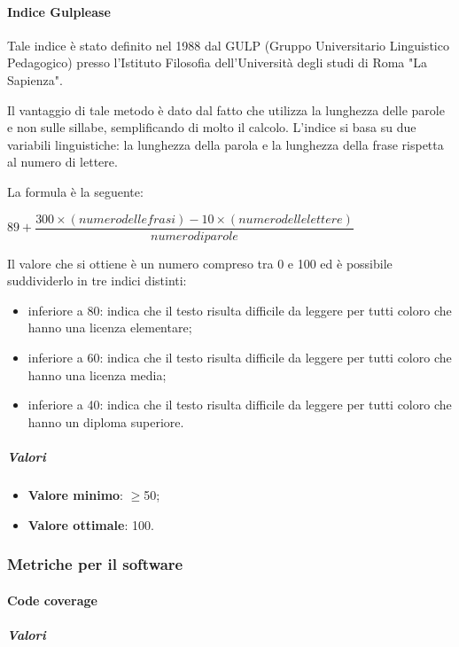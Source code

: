 \paragraph*{Indice Gulplease}
Tale indice è stato definito nel 1988 dal GULP (Gruppo Universitario Linguistico Pedagogico) presso l'Istituto Filosofia dell'Università degli studi di Roma "La Sapienza".

Il vantaggio di tale metodo è dato dal fatto che utilizza la lunghezza delle parole e non sulle sillabe, semplificando di molto il calcolo. L'indice si basa su due variabili linguistiche: la lunghezza della parola e la lunghezza della frase rispetta al numero di lettere.

La formula è la seguente:
\begin{center}
$89+\dfrac{300\times(numerodellefrasi)-10\times(numero delle lettere)}{numero di parole}$
\end{center}
Il valore che si ottiene è un numero compreso tra 0 e 100 ed è possibile suddividerlo in tre indici distinti:
\begin{itemize}
	\item inferiore a 80: indica che il testo risulta difficile da leggere per tutti coloro che hanno una licenza elementare;
	\item inferiore a 60: indica che il testo risulta difficile da leggere per tutti coloro che hanno una licenza media;
	\item inferiore a 40: indica che il testo risulta difficile da leggere per tutti coloro che hanno un diploma superiore.
\end{itemize}
\subparagraph{Valori}
\begin{itemize}
	\item \textbf{Valore minimo}: $\geq$50;
	\item \textbf{Valore ottimale}: 100.
\end{itemize}
\subsubsection{Metriche per il software}
\paragraph*{Code coverage}
\subparagraph*{Valori}
